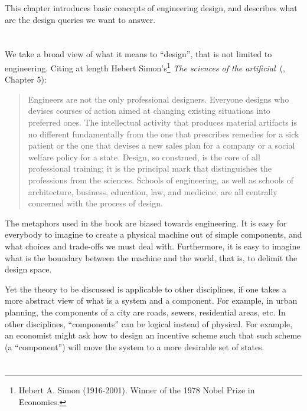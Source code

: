 This chapter introduces basic concepts of engineering design, and describes what are the design queries we want to answer.


\section{}
\label{sec:design-what-is-design}

We take a broad view of what it means to ``design'', that is not limited to engineering. Citing at length
Hebert Simon's\footnote{Hebert A. Simon (1916-2001). Winner of the 1978 Nobel Prize in Economics.}
\emph{The sciences of the artificial}~(\cite{hebert96sciences}, Chapter 5):

\begin{quote}
    Engineers are not the only professional designers. Everyone designs who devises courses of action aimed at changing existing situations into preferred ones. The intellectual activity that produces material artifacts is no different fundamentally from the one that prescribes remedies for a sick patient or the one that devises a new sales plan for a company or a social welfare policy for a state. Design, so construed, is the core of all professional training; it is the principal mark that distinguishes the professions from the sciences. Schools of engineering, as well as schools of architecture, business, education, law, and medicine, are all centrally concerned with the process of design.
\end{quote}

The metaphors used in the book are biased towards engineering.
It is easy for everybody to imagine to create a physical machine out of simple components, and what choices and trade-offs we must deal with.
Furthermore, it is easy to imagine what is the boundary between the machine and the world, that is, to delimit the design space.

Yet the theory to be discussed is applicable to other disciplines, if one takes a more abstract view of what is a system and a component.
For example, in urban planning, the components of a city are roads, sewers, residential areas, etc.
In other disciplines, ``components'' can be logical instead of physical.
For example, an economist might ask how to design an incentive scheme such that such scheme (a ``component'') will move the system to a more
desirable set of states.


\section{}
\label{sec:design-what-is-co-design}

